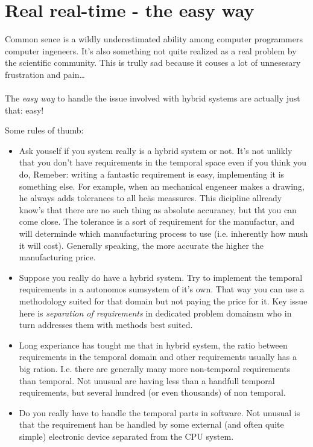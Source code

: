\chapter{Real real-time - the easy way}
Common sence is a wildly underestimated ability among computer programmers computer ingeneers. It's also something not quite realized as a real problem by the scientific community. This is trully sad because it couses a lot of unnesesary frustration and pain\ldots
\\\\
The \textit{easy way} to handle the issue involved with hybrid systems are actually just that: easy! 

Some rules of thumb:
\begin{itemize}
\item Ask youself if you system really is a hybrid system or not. It's not unlikly that you don't have requirements in the temporal space even if you think you do, Remeber: writing a fantastic requirement is easy, implementing it is something else. For example, when an mechanical engeneer makes a drawing, he always adds tolerances to all heäs meassures. This dicipline allready know's that there are no such thing as absolute accurancy, but tht you can come close. The tolerance is a sort of requirement for the manufactur, and will determinde which manufacturing process to use (i.e. inherently how mush it will cost). Generally speaking, the more accurate the higher the manufacturing price.
\item Suppose you really do have a hybrid system. Try to implement the temporal requirements in a autonomos sumsystem of it's own. That way you can use a methodology suited for that domain but not paying the price for it. Key issue here is \textit{separation of requirements} in dedicated problem domainsm who in turn addresses them with methods best suited.
\item Long experiance has tought me that in hybrid system, the ratio between requirements in the temporal domain and other requirements usually has a big ration. I.e. there are generally many more non-temporal requirements than temporal. Not unusual are having less than a handfull temporal requirements, but several hundred (or even thousands) of non temporal.
\item Do you really have to handle the temporal parts in software. Not unusual is that the requirement han be handled by some external (and often quite simple) electronic device separated from the CPU system.
\end{itemize}



